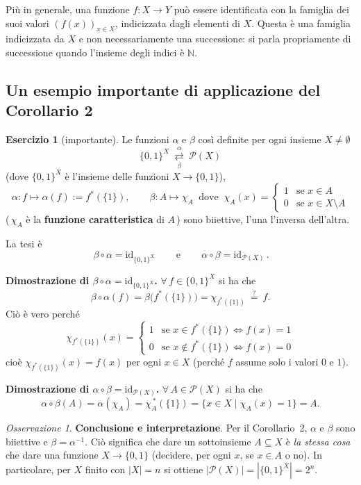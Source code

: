 \documentclass[11pt,a4paper]{article}
\newcommand{\Pot}{\mathcal{P}}
\newcommand{\id}{\mathrm{id}}
\newcommand{\inv}{^{-1}}
\theoremstyle{definition}
\newtheorem{esercizio}[definizione]{Esercizio}
\theoremstyle{plain}
\theoremstyle{remark}
\newtheorem*{osservazione}{Osservazione}
\begin{document}
Più in generale, una funzione $f\colon X\to Y$ può essere identificata con la famiglia dei suoi valori $(f(x))_{x\in X}$, indicizzata dagli elementi di $X$. Questa è una famiglia indicizzata da $X$ e non necessariamente una successione: si parla propriamente di successione quando l'insieme degli indici è $\mathbb N$.

\subsection{Un esempio importante di applicazione del Corollario 2}

\begin{esercizio}[importante]\label{es:partizione-2}
Le funzioni $\alpha$ e $\beta$ cos\`i definite per ogni insieme $X\neq\emptyset$
\[
\{0,1\}^X\ \underset{\beta}{\overset{\alpha}{\rightleftarrows}}\ \Pot(X)
\]
(dove $\{0,1\}^X$ \`e l'insieme delle funzioni $X\to\{0,1\}$),
\[
\alpha\colon f\longmapsto\alpha(f):=f^*(\{1\}),\qquad
\beta\colon A\longmapsto\chi_A\ \text{ dove }\ \chi_A(x)=\begin{cases}1&\text{se }x\in A\\0&\text{se }x\in X\setminus A\end{cases}
\]
(\,$\chi_A$ \`e la \textbf{funzione caratteristica} di $A$\,) sono biiettive, l'una l'inversa dell'altra.
\end{esercizio}

La tesi \`e
\[
{\,\beta\circ\alpha=\id_{\{0,1\}^X}\,}\qquad\text{e}\qquad{\,\alpha\circ\beta=\id_{\Pot(X)}\,}.
\]

\textbf{Dimostrazione di $\beta\circ\alpha=\id_{\{0,1\}^X}$.} $\forall\,f\in\{0,1\}^X$ si ha che
\[
\beta\circ\alpha(f)=\beta\bigl(f^*(\{1\})\bigr)=\chi_{f^*(\{1\})}\ \overset{?}{=}\ f .
\]
Ci\`o \`e vero perch\'e
\[
\chi_{f^*(\{1\})}(x)=\begin{cases}1&\text{se }x\in f^*(\{1\})\iff f(x)=1\\[2pt]0&\text{se }x\notin f^*(\{1\})\iff f(x)=0\end{cases}
\]
cio\`e $\chi_{f^*(\{1\})}(x)=f(x)$ per ogni $x\in X$ (perch\'e $f$ assume solo i valori $0$ e $1$).

\textbf{Dimostrazione di $\alpha\circ\beta=\id_{\Pot(X)}$.} $\forall\,A\in\Pot(X)$ si ha che
\[
\alpha\circ\beta(A)=\alpha(\chi_A)=\chi_A^{\,*}(\{1\})=\{x\in X\mid\chi_A(x)=1\}=A .
\]

\begin{osservazione}
\textbf{Conclusione e interpretazione}. 
Per il Corollario~2, $\alpha$ e $\beta$ sono biiettive e $\beta=\alpha\inv$. Ci\`o significa che dare un sottoinsieme $A\subseteq X$ \`e \emph{la stessa cosa} che dare una funzione $X\to\{0,1\}$ (decidere, per ogni $x$, se $x\in A$ o no). In particolare, per $X$ finito con $|X|=n$ si ottiene $|\Pot(X)|=|\{0,1\}^X|=2^n$.
\end{osservazione}
\end{document}
